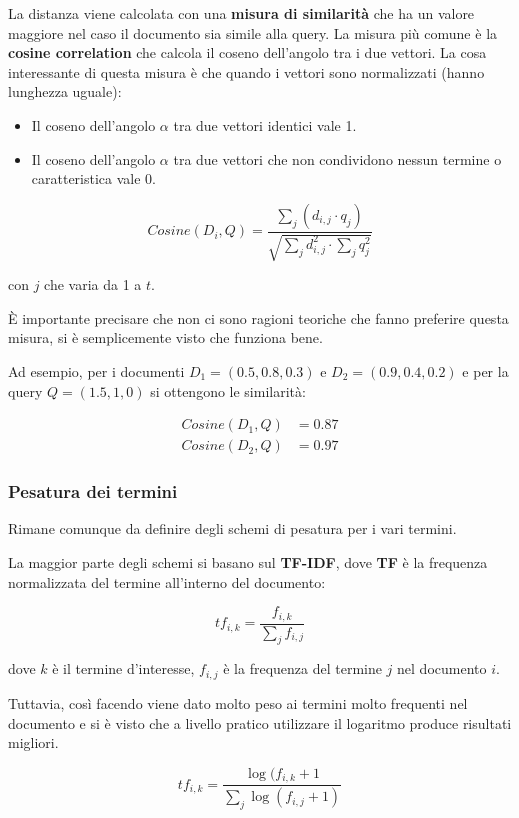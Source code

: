 La distanza viene calcolata con una \textbf{misura di similarità} che ha un valore maggiore nel caso il documento sia simile alla query.
La misura più comune è la \textbf{cosine correlation} che calcola il coseno dell'angolo tra i due vettori.
La cosa interessante di questa misura è che quando i vettori sono normalizzati (hanno lunghezza uguale):

\begin{itemize}
	\item Il coseno dell'angolo $\alpha$ tra due vettori identici vale 1.
	\item Il coseno dell'angolo $\alpha$ tra due vettori che non condividono nessun termine o caratteristica vale 0.
\end{itemize} 

$$
Cosine(D_i, Q) = \frac{\sum\limits_j (d_{i,j} \cdot q_j)}{\sqrt{\sum\limits_j d_{i,j}^2 \cdot \sum\limits_j q_{j}^2}}
$$

\noindent con $j$ che varia da 1 a $t$.

\`E importante precisare che non ci sono ragioni teoriche che fanno preferire questa misura, si è semplicemente visto che funziona bene.

Ad esempio, per i documenti $D_1 = (0.5, 0.8, 0.3)$ e $D_2 = (0.9, 0.4, 0.2)$ e per la query $Q = (1.5, 1, 0)$ si ottengono le similarità:

\begin{align*}
	Cosine(D_1,Q) &= 0.87 \\
	Cosine(D_2, Q) &= 0.97
\end{align*}

\subsubsection{Pesatura dei termini}

Rimane comunque da definire degli schemi di pesatura per i vari termini.

La maggior parte degli schemi si basano sul \textbf{TF-IDF}, dove \textbf{TF} è la frequenza normalizzata del termine all'interno del documento:

$$
tf_{i,k} = \frac{f_{i,k}}{\sum\limits_j f_{i,j}}
$$

\noindent dove $k$ è il termine d'interesse, $f_{i,j}$ è la frequenza del termine $j$ nel documento $i$.

Tuttavia, così facendo viene dato molto peso ai termini molto frequenti nel documento e si è visto che a livello pratico utilizzare il logaritmo produce risultati migliori.

$$
tf_{i,k} = \frac{\log (f_{i,k}+1}{\sum\limits_j \log (f_{i,j} +1)}
$$
